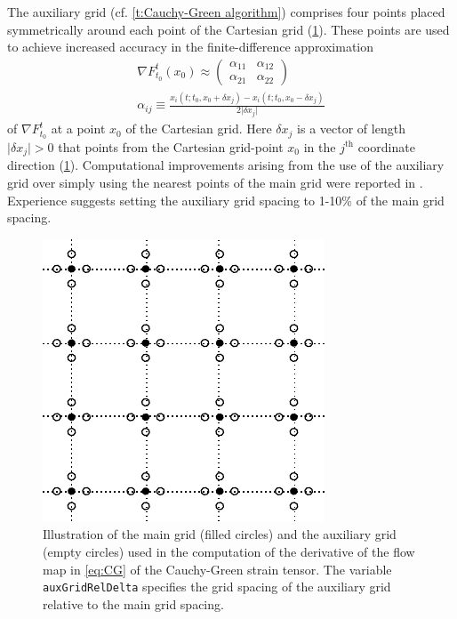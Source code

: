 \documentclass[5p]{elsarticle}
\begin{document}
The auxiliary grid (cf. \cref{t:Cauchy-Green algorithm}) comprises four points placed symmetrically around each point of the Cartesian grid (\cref{f:main and auxiliary grids}). These points are used to achieve increased accuracy in the finite-difference approximation
\begin{gather*}
\nabla F_{t_0}^t(x_0) \approx
\left(\begin{array}{cc}
\alpha_{11} & \alpha_{12}
\\
\alpha_{21} & \alpha_{22}
\end{array}\right)
\\
\alpha_{ij} \equiv \frac{x_i(t;t_0,x_0+\delta x_j) - x_i(t;t_0,x_0-\delta x_j)}{2\vert\delta x_j\vert}
\end{gather*}
of $\nabla F_{t_0}^t$ at a point $x_0$ of the Cartesian grid. Here $\delta x_j$ is a vector of length $\vert\delta x_j\vert > 0$ that points from the Cartesian grid-point $x_0$ in the $j^\text{th}$ coordinate direction (\cref{f:main and auxiliary grids}). Computational improvements arising from the use of the auxiliary grid over simply using the nearest points of the main grid were reported in \citet{farazmand12:_comput_lagran}. Experience suggests setting the auxiliary grid spacing to 1-10\% of the main grid spacing.

\begin{figure}
\begin{center}
\includegraphics[width=.475\textwidth]{graphics/main_aux_grids}
\end{center}
\caption{Illustration of the main grid (filled circles) and the auxiliary grid (empty circles) used in the computation of the derivative of the flow map in \cref{eq:CG} of the Cauchy-Green strain tensor. The variable \lstinline!auxGridRelDelta! specifies the grid spacing of the auxiliary grid relative to the main grid spacing.}
\label{f:main and auxiliary grids}
\end{figure}
\end{document}

